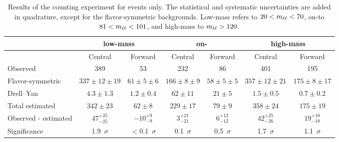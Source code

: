 
\begin{table}[hbtp]
 \renewcommand{\arraystretch}{1.3}
 \setlength{\belowcaptionskip}{6pt}
 \scriptsize
 \centering
 \caption{Results of the counting experiment for \EE events only.
     The statistical and systematic uncertainties are added in quadrature, except for the flavor-symmetric backgrounds.
     Low-mass refers to $20 < m_{\ell\ell} < 70$\GeV, on-\Z to  $81 < m_{\ell\ell} < 101$\GeV, and high-mass to $m_{\ell\ell} > 120$\GeV.
     }
  \label{tab:METresults2012EE}
  \begin{tabular}{l| cc | cc | cc}

    							& \multicolumn{2}{c}{low-mass} & \multicolumn{2}{c}{on-\Z} & \multicolumn{2}{c}{high-mass} \\ 

    \hline
                                &  Central        & Forward  &  Central  & Forward   &  Central        & Forward \\ 

    \hline
        Observed       &  389                   & 53              &  232            &  86       &   401           &   195    \\

    \hline
        Flavor-symmetric    & $337\pm12\pm19$        & $61\pm5\pm6$  &  $166\pm8\pm9$ & $58\pm5\pm5$ & $357\pm12\pm21$ & $175\pm8\pm17$ \\

            Drell--Yan          & $4.3\pm1.3$            & $1.2\pm0.4$      & $62\pm11$ & $21\pm5$ & $1.5\pm0.5$ & $0.7\pm0.2$ \\

    \hline
            Total estimated          & $342\pm23$            & $62\pm8$      & $229\pm17$ & $79\pm9$ & $358\pm24$ & $175\pm19$ \\

    \hline
         Observed - estimated  & $47^{+25}_{-25}$      & $-10^{+9}_{-9}$ & $3^{+21}_{-21} $ & $6^{+12}_{-12}$ & $42^{+25}_{-26}$ & $19^{+18}_{-18} $ \\ 

    \hline
   Significance      & 1.9~$\sigma$    &  $<$0.1~$\sigma$  & 0.1~$\sigma$ & 0.5~$\sigma$ & 1.7~$\sigma$ & 1.1~$\sigma$ \\ 


  \end{tabular}
\end{table}



